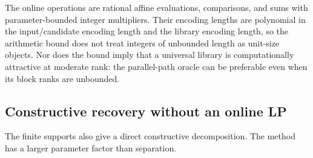 The online operations are rational affine evaluations, comparisons, and
sums with parameter-bounded integer multipliers. Their encoding lengths
are polynomial in the input/candidate encoding length and the library
encoding length, so the arithmetic bound does not treat integers of
unbounded length as unit-size objects. Nor does the bound imply that a
universal library is computationally attractive at moderate rank: the
parallel-path oracle can be preferable even when its block ranks are
unbounded.

\subsection{Constructive recovery without an online LP}\label{subsec:rank-recovery}
The finite supports also give a direct constructive decomposition. The
method has a larger parameter factor than separation.

